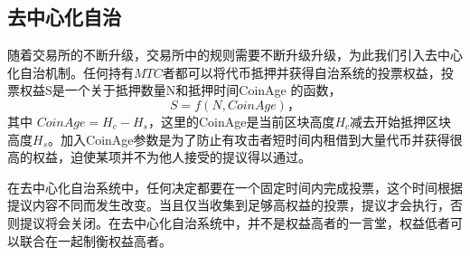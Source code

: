 \documentclass[UTF8,nofonts]{ctexart}
\begin{document}
\subsection{去中心化自治}
随着交易所的不断升级，交易所中的规则需要不断升级升级，为此我们引入去中心化自治机制。任何持有$MTC$者都可以将代币抵押并获得自治系统的投票权益，投票权益S是一个关于抵押数量N和抵押时间CoinAge 的函数，
$$S = f(N, CoinAge)\text{，}$$
其中 $CoinAge = H_{c}-H_{s}$，这里的CoinAge是当前区块高度$H_{c}$减去开始抵押区块高度$H_{s}$。加入CoinAge参数是为了防止有攻击者短时间内租借到大量代币并获得很高的权益，迫使某项并不为他人接受的提议得以通过。

在去中心化自治系统中，任何决定都要在一个固定时间内完成投票，这个时间根据提议内容不同而发生改变。当且仅当收集到足够高权益的投票，提议才会执行，否则提议将会关闭。在去中心化自治系统中，并不是权益高者的一言堂，权益低者可以联合在一起制衡权益高者。
\end{document}
